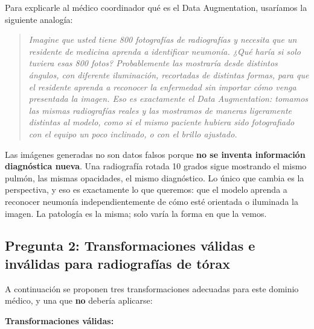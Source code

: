 \documentclass[12pt, letterpaper]{article}
\begin{document}
Para explicarle al médico coordinador qué es el Data Augmentation, usaríamos la siguiente analogía:

\begin{quote}
\itshape
Imagine que usted tiene 800 fotografías de radiografías y necesita que un residente de medicina
aprenda a identificar neumonía. ¿Qué haría si solo tuviera esas 800 fotos? Probablemente las
mostraría desde distintos ángulos, con diferente iluminación, recortadas de distintas formas,
para que el residente aprenda a reconocer la enfermedad sin importar cómo venga presentada la imagen.
Eso es exactamente el Data Augmentation: tomamos las mismas radiografías reales y las mostramos
de maneras ligeramente distintas al modelo, como si el mismo paciente hubiera sido fotografiado
con el equipo un poco inclinado, o con el brillo ajustado.
\end{quote}

Las imágenes generadas no son datos falsos porque \textbf{no se inventa información diagnóstica nueva}.
Una radiografía rotada 10 grados sigue mostrando el mismo pulmón, las mismas opacidades, el mismo
diagnóstico. Lo único que cambia es la perspectiva, y eso es exactamente lo que queremos: que el
modelo aprenda a reconocer neumonía independientemente de cómo esté orientada o iluminada la imagen.
La patología es la misma; solo varía la forma en que la vemos.

\subsection{Pregunta 2: Transformaciones válidas e inválidas para radiografías de tórax}

A continuación se proponen tres transformaciones adecuadas para este dominio médico, y una que
\textbf{no} debería aplicarse:

\medskip

\textbf{Transformaciones válidas:}
\end{document}
